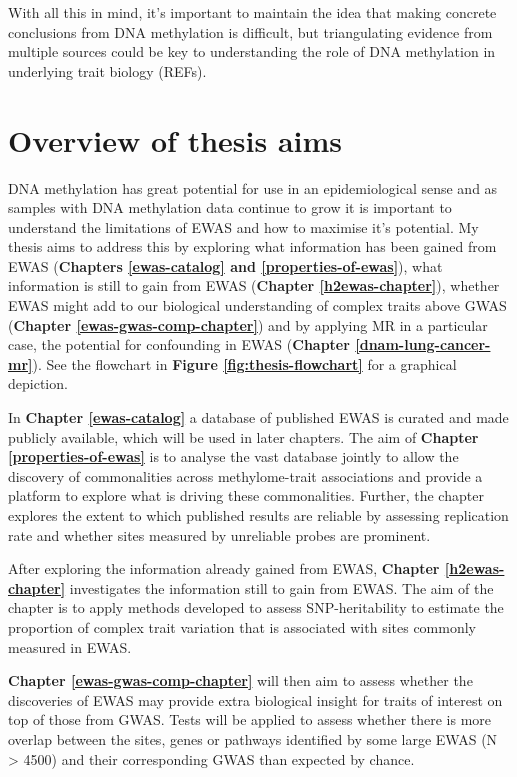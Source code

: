 \documentclass[11pt,twoside]{bristolthesis}
\begin{document}
With all this in mind, it's important to maintain the idea that making concrete conclusions from DNA methylation is difficult, but triangulating evidence from multiple sources could be key to understanding the role of DNA methylation in underlying trait biology (REFs).

\hypertarget{overview-of-thesis-aims}{%
\section{Overview of thesis aims}\label{overview-of-thesis-aims}}

DNA methylation has great potential for use in an epidemiological sense and as samples with DNA methylation data continue to grow it is important to understand the limitations of EWAS and how to maximise it's potential. My thesis aims to address this by exploring what information has been gained from EWAS (\textbf{Chapters \ref{ewas-catalog} and \ref{properties-of-ewas}}), what information is still to gain from EWAS (\textbf{Chapter \ref{h2ewas-chapter}}), whether EWAS might add to our biological understanding of complex traits above GWAS (\textbf{Chapter \ref{ewas-gwas-comp-chapter}}) and by applying MR in a particular case, the potential for confounding in EWAS (\textbf{Chapter \ref{dnam-lung-cancer-mr}}). See the flowchart in \textbf{Figure \ref{fig:thesis-flowchart}} for a graphical depiction.

In \textbf{Chapter \ref{ewas-catalog}} a database of published EWAS is curated and made publicly available, which will be used in later chapters. The aim of \textbf{Chapter \ref{properties-of-ewas}} is to analyse the vast database jointly to allow the discovery of commonalities across methylome-trait associations and provide a platform to explore what is driving these commonalities. Further, the chapter explores the extent to which published results are reliable by assessing replication rate and whether sites measured by unreliable probes are prominent.

After exploring the information already gained from EWAS, \textbf{Chapter \ref{h2ewas-chapter}} investigates the information still to gain from EWAS. The aim of the chapter is to apply methods developed to assess SNP-heritability to estimate the proportion of complex trait variation that is associated with sites commonly measured in EWAS.

\textbf{Chapter \ref{ewas-gwas-comp-chapter}} will then aim to assess whether the discoveries of EWAS may provide extra biological insight for traits of interest on top of those from GWAS. Tests will be applied to assess whether there is more overlap between the sites, genes or pathways identified by some large EWAS (N \textgreater{} 4500) and their corresponding GWAS than expected by chance.
\end{document}
